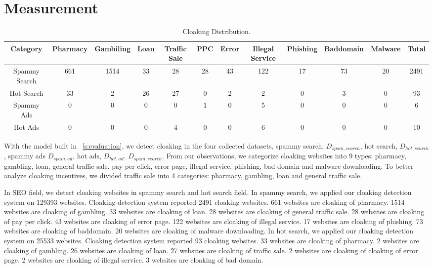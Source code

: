 \section{Measurement}
\label{s:measurement}

\begin{table}
\centering
\begin{center}
\begin{tabular}{c|c|c|c|c|c|c|c|c|c|c|c}
Category & Pharmacy & Gambiling & Loan & Traffic Sale & PPC & Error & Illegal Service & Phishing & Baddomain &  Malware & Total\\
\hline
Spammy Search & 661 & 1514 & 33 & 28 & 28 & 43 & 122 & 17 & 73 & 20 & 2491 \\
Hot Search & 33 & 2 & 26 & 27 & 0 &  2 & 2 & 0 &   3 & 0 & 93\\
Spammy Ads & 0 & 0 & 0 & 0 & 1 & 0 & 5 & 0 & 0 & 0 & 6\\
Hot Ads & 0 & 0 & 0 & 4 & 0 &  0 & 6 & 0 & 0 & 0 & 10\\
\end{tabular}
\end{center}
\caption{Cloaking Distribution.}
\end{table}

With the model built in ~\autoref{s:evaluation}, we detect cloaking in
the four collected datasets, spammy search, $D_{spam, search}$, hot search,
$D_{hot, search}$, spammy ads $D_{spam, ad}$, hot ads, $D_{hot, ad}$. 
$D_{spam, search}$. From our observations, we categorize cloaking websites into 9 types:
pharmacy, gambling, loan, general traffic sale, pay per click, error page, illegal service,
phishing, bad domain and malware downloading. To better analyze cloaking incentives, 
we divided traffic sale into 4 categories: pharmacy, gambling, loan and general traffic sale. 


In SEO field, we detect cloaking websites in spammy search and hot search field. In spammy search,
we applied our cloaking detection system on 129393 websites. Cloaking detection system reported 2491
cloaking websites. 661 websites are cloaking of pharmacy. 1514 websites are cloaking of gambling.
33 websites are cloaking of loan. 28 websites are cloaking of general traffic sale. 28 websites are cloaking
of pay per click. 43 websites are cloaking of error page. 122 websites are cloaking of illegal service. 
17 websites are cloaking of phishing. 73 websites are cloaking of baddomain. 20 websites are cloaking of malware downloading.
In hot search, we applied our cloaking detection system on 25533 websites. Cloaking detection system reported 93
cloaking websites. 33 websites are cloaking of pharmacy. 2 websites are cloaking of gambling.
26 websites are cloaking of loan. 27 websites are cloaking of traffic sale. 2 websites are cloaking of cloaking of
error page. 2 websites are cloaking of illegal service. 3 websites are cloaking of bad domain. 

